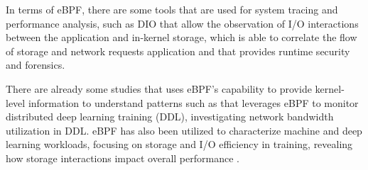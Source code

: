 \documentclass[conference]{IEEEtran}
\begin{document}

In terms of eBPF, there are some tools that are used for system tracing and performance analysis,
such as DIO \cite{DIO} that allow the observation of I/O interactions between the application and in-kernel storage,
\cite{CAT} which is able to correlate the flow of storage and network requests application and \cite{tracee} that provides runtime security and forensics.  

There are already some studies that uses eBPF's capability to provide kernel-level information to understand patterns such as \cite{eBPFDLNetwork} that
leverages eBPF to monitor distributed deep learning training (DDL), investigating network bandwidth utilization in DDL.
eBPF has also been utilized to characterize machine and deep learning workloads, focusing on storage and I/O efficiency in training,
revealing how storage interactions impact overall performance \cite{OanaDL, OanaML}.
\end{document}
